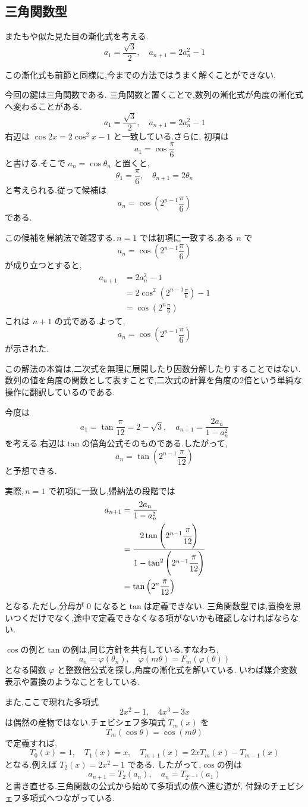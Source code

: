 \subsection{三角関数型}
またもや似た見た目の漸化式を考える.
\[
  a_1=\frac{\sqrt{3}}{2},\quad a_{n+1}=2a_n^2-1
\]

この漸化式も前節と同様に,今までの方法ではうまく解くことができない.

今回の鍵は三角関数である.
三角関数と置くことで,数列の漸化式が角度の漸化式へ変わることがある.
\[
  a_1=\frac{\sqrt{3}}{2},\quad a_{n+1}=2a_n^2-1
\]
右辺は $\cos 2x=2\cos^2x-1$ と一致している.さらに,
初項は
\[
  a_1=\cos\frac{\pi}{6}
\]
と書ける.そこで $a_n=\cos\theta_n$ と置くと,
\[
  \theta_1=\frac{\pi}{6},
  \quad
  \theta_{n+1}=2\theta_n
\]
と考えられる.従って候補は
\[
  a_n=\cos\left(2^{n-1}\frac{\pi}{6}\right)
\]
である.

この候補を帰納法で確認する.\,$n=1$ では初項に一致する.ある $n$ で
\[
  a_n=\cos\left(2^{n-1}\frac{\pi}{6}\right)
\]
が成り立つとすると,
\begin{align*}
  a_{n+1}
    &=2a_n^2-1\\
    &=2\cos^2\left(2^{n-1}\frac{\pi}{6}\right)-1\\
    &=\cos\left(2^n\frac{\pi}{6}\right)
\end{align*}
これは $n+1$ の式である.よって,
\[
  a_n=\cos\left(2^{n-1}\frac{\pi}{6}\right)
\]
が示された.

この解法の本質は,二次式を無理に展開したり因数分解したりすることではない.
数列の値を角度の関数として表すことで,二次式の計算を角度の2倍という単純な操作に翻訳しているのである.

今度は
\[
  a_1=\tan\frac{\pi}{12}=2-\sqrt{3},
  \quad
  a_{n+1}=\frac{2a_n}{1-a_n^2}
\]
を考える.右辺は$\tan$の倍角公式そのものである.したがって,
\[
  a_n=\tan\left(2^{n-1}\frac{\pi}{12}\right)
\]
と予想できる.

実際,\,$n=1$ で初項に一致し,帰納法の段階では
\begin{align*}
  a_{n+1}
    &=\frac{2a_n}{1-a_n^2}\\
    &=\cfrac{2\tan\left(2^{n-1}\cfrac{\pi}{12}\right)}
            {1-\tan^2\left(2^{n-1}\cfrac{\pi}{12}\right)}\\
    &=\tan\left(2^n\frac{\pi}{12}\right)
\end{align*}
となる.ただし,分母が $0$ になると$\tan$は定義できない.
三角関数型では,置換を思いつくだけでなく,途中で定義できなくなる項がないかも確認しなければならない.

$\cos$の例と$\tan$の例は,同じ方針を共有している.すなわち,
\[
  a_n=\varphi(\theta_n),
  \quad
  \varphi(m\theta)=F_m(\varphi(\theta))
\]
となる関数 $\varphi$ と整数倍公式を探し,角度の漸化式を解いている.
いわば媒介変数表示や置換のようなことをしている.

また,ここで現れた多項式
\[
  2x^2-1,
  \quad
  4x^3-3x
\]
は偶然の産物ではない.チェビシェフ多項式 $T_m(x)$ を
\[
  T_m(\cos\theta)=\cos(m\theta)
\]
で定義すれば,
\[
  T_0(x)=1,
  \quad
  T_1(x)=x,
  \quad
  T_{m+1}(x)=2xT_m(x)-T_{m-1}(x)
\]
となる.例えば $T_2(x)=2x^2-1$ である.
したがって,$\cos$の例は
\[
  a_{n+1}=T_2(a_n),
  \quad
  a_n=T_{2^{n-1}}(a_1)
\]
と書き直せる.三角関数の公式から始めて多項式の族へ進む道が,
付録のチェビシェフ多項式へつながっている.
